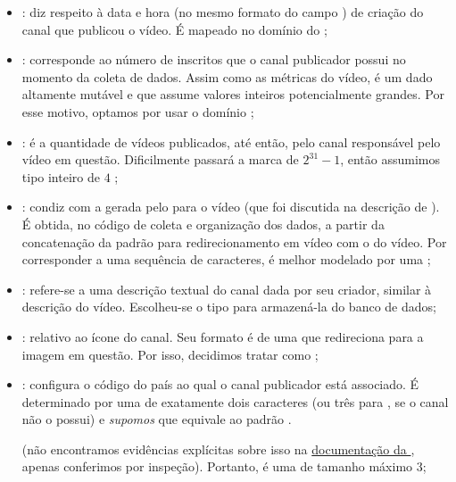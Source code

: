 \begin{itemize}
    \item {}: diz respeito à data e hora (no mesmo formato  do campo ) de criação do canal que publicou o vídeo. É mapeado no domínio  do ;
    \item {}: corresponde ao número de inscritos que o canal publicador possui no momento da coleta de dados. Assim como as métricas do vídeo, é um dado altamente mutável e que assume valores inteiros potencialmente grandes. Por esse motivo, optamos por usar o domínio ;
    \item {}: é a quantidade de vídeos publicados, até então, pelo canal responsável pelo vídeo em questão. Dificilmente passará a marca de $2^{31} - 1$, então assumimos tipo inteiro de $4$ ;
    \item {}: condiz com a  gerada pelo  para o vídeo (que foi discutida na descrição de ). É obtida, no código de coleta e organização dos dados, a partir da concatenação da  padrão para redirecionamento em vídeo com o  do vídeo. Por corresponder a uma sequência de caracteres, é melhor modelado por uma ;
    \item {}: refere-se a uma descrição textual do canal dada por seu criador, similar à descrição do vídeo. Escolheu-se o tipo  para armazená-la do banco de dados;
    \item {}: relativo ao ícone do canal. Seu formato é de uma  que redireciona para a imagem em questão. Por isso, decidimos tratar como ;
    \item {}: configura o código do país ao qual o canal publicador está associado. É determinado por uma  de exatamente dois caracteres (ou três para , se o canal não o possui) e \emph{supomos} que equivale ao padrão \href{https://www.iso.org/iso-3166-country-codes.html}{} \cite{iso-3166}.

    (não encontramos evidências explícitas sobre isso na \href{https://developers.google.com/youtube/v3/docs/channels?hl=pt-br#snippet.country}{documentação da }, apenas conferimos por inspeção). Portanto, é uma  de tamanho máximo 3;


\end{itemize}
